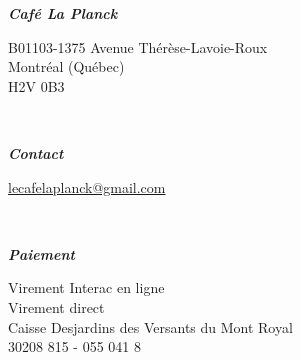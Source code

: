 \documentclass{CSMinimalInvoice}
\newcommand{\espacesection}{\begin{minipage}[t]{0.03\textwidth}
	~ %
\end{minipage}}
\begin{document}
\begin{minipage}[t]{0.3\textwidth}
\itshape
\textbf{Café La Planck}

B01103-1375 Avenue Thérèse-Lavoie-Roux\\
Montréal (Québec)\\
H2V 0B3
\end{minipage}
\espacesection
\begin{minipage}[t]{0.3\textwidth}
\itshape
\textbf{Contact}

\href{mailto:lecafelaplanck@gmail.com}{lecafelaplanck@gmail.com}
\end{minipage}
\espacesection
\begin{minipage}[t]{0.3\textwidth}
\itshape
\textbf{Paiement}

Virement Interac en ligne\\
Virement direct\\
Caisse Desjardins des Versants du Mont Royal\\
30208 815 - 055 041 8
\end{minipage}
\end{document}
